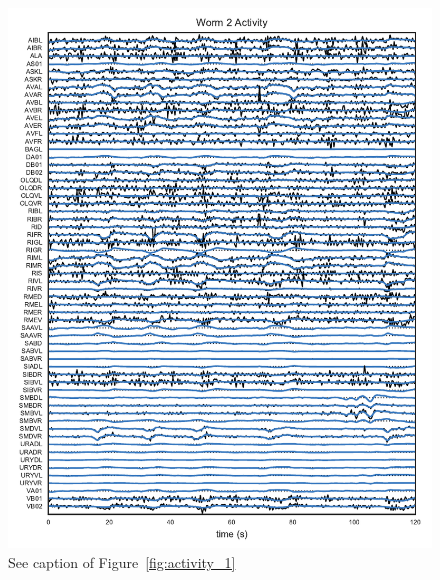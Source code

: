 \documentclass{article}
\begin{document}
\begin{figure}[h]
  \centering
  \includegraphics[width=5.5in]{figures/lds/y_1}
  \caption{See caption of Figure~\ref{fig:activity_1}}
  \label{fig:activity_2}
\end{figure}
\end{document}
